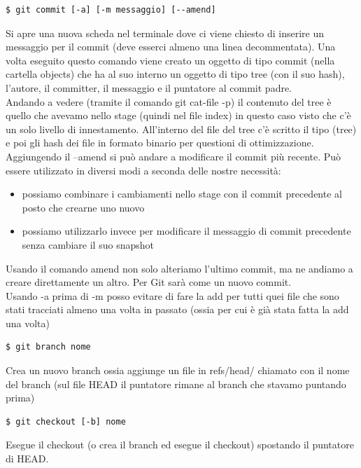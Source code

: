 \begin{verbatim}
$ git commit [-a] [-m messaggio] [--amend]
\end{verbatim}
Si apre una nuova scheda nel terminale dove ci viene chiesto di inserire un messaggio per il commit (deve esserci almeno una linea decommentata). Una volta eseguito questo comando viene creato un oggetto di tipo commit (nella cartella objects) che ha al suo interno un oggetto di tipo tree (con il suo hash), l'autore, il committer, il messaggio e il puntatore al commit padre. \\
Andando a vedere (tramite il comando git cat-file -p) il contenuto del tree è quello che avevamo nello stage (quindi nel file index) in questo caso visto che c'è un solo livello di innestamento.
All'interno del file del tree c'è scritto il tipo (tree) e poi gli hash dei file in formato binario per questioni di ottimizzazione. \\
Aggiungendo il --amend si può andare a modificare il commit più recente. Può essere utilizzato in diversi modi a seconda delle nostre necessità: 
\begin{itemize}
    \item possiamo combinare i cambiamenti nello stage con il commit precedente al posto che crearne uno nuovo
    \item possiamo utilizzarlo invece per modificare il messaggio di commit precedente senza cambiare il suo snapshot
\end{itemize}
Usando il comando amend non solo alteriamo l'ultimo commit, ma ne andiamo a creare direttamente un altro. Per Git sarà come un nuovo commit.\\
Usando -a prima di -m posso evitare di fare la add per tutti quei file che sono stati tracciati almeno una volta in passato (ossia per cui è già stata fatta la add una volta)

\begin{verbatim}
$ git branch nome
\end{verbatim}
Crea un nuovo branch ossia aggiunge un file in refs/head/ chiamato con il nome del branch (sul file HEAD il puntatore rimane al branch che stavamo puntando prima)

\begin{verbatim}
$ git checkout [-b] nome
\end{verbatim}
Esegue il checkout (o crea il branch ed esegue il checkout) spostando il puntatore di HEAD.\\\\


